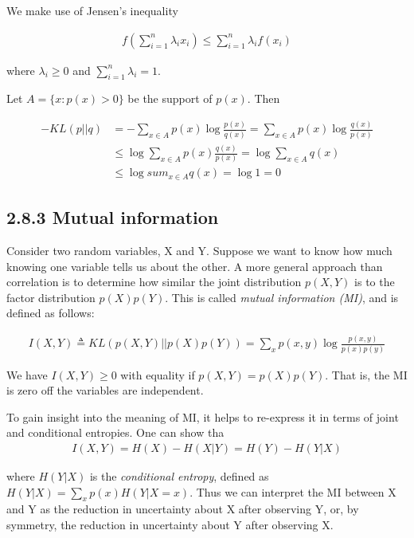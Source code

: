 \documentclass{amsart}
\begin{document}
We make use of Jensen's inequality

\begin{align*}
	f(\sum_{i=1}^n \lambda_i x_i) \leq \sum_{i=1}^n \lambda_i f(x_i)
\end{align*}

where $\lambda_i \geq 0$ and $\sum_{i=1}^n \lambda_i =1$.

Let $A = \{ x : p(x) > 0 \}$ be the support of $p(x)$. Then

\begin{align*}
	-KL(p||q) &= -\sum_{x \in A} p(x) \log{\frac{p(x)}{q(x)}} = \sum_{x \in A} p(x) \log{\frac{q(x)}{p(x)}} \\
	&\leq \log{\sum_{x \in A} p(x) \frac{q(x)}{p(x)}} = \log{\sum_{x \in A} q(x)} \\
	&\leq \log{sum_{x \in A} q(x)} = \log{1} = 0
\end{align*}

\subsection{2.8.3 Mutual information}

Consider two random variables, X and Y. Suppose we want to know how much knowing one
variable tells us about the other. A more general approach than correlation is to
determine how similar the joint distribution $p(X, Y)$ is to the factor distribution
$p(X) p(Y)$. This is called \emph{mutual information (MI)}, and is defined as follows:

\begin{align*}
	I(X, Y) \triangleq KL(p(X, Y) || p(X)p(Y))= \sum_x p(x, y) \log{\frac{p(x, y)}{p(x)p(y)}}
\end{align*}

We have $I(X, Y) \geq 0$ with equality if $p(X, Y) = p(X)p(Y)$. That is, the MI is
zero off the variables are independent.

To gain insight into the meaning of MI, it helps to re-express it in terms of joint
and conditional entropies. One can show tha
\begin{align*}
	I(X, Y) = H(X) - H(X|Y) = H(Y) - H(Y|X)
\end{align*}

where $H(Y|X)$ is the \emph{conditional entropy}, defined as
$H(Y|X)=\sum_x p(x) H(Y|X=x)$. Thus we can interpret the MI between X and Y as the
reduction in uncertainty about X after observing Y, or, by symmetry, the reduction in
uncertainty about Y after observing X.
\end{document}
